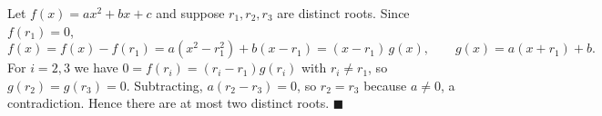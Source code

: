 Let $f(x)=ax^2+bx+c$ and suppose $r_1,r_2,r_3$ are distinct roots. Since $f(r_1)=0$,
\[f(x)=f(x)-f(r_1)=a\left(x^2-r_1^2\right)+b(x-r_1)=(x-r_1)\,g(x),\qquad g(x)=a(x+r_1)+b.\]
For $i=2,3$ we have $0=f(r_i)=(r_i-r_1)g(r_i)$ with $r_i\ne r_1$, so $g(r_2)=g(r_3)=0$. Subtracting, $a(r_2-r_3)=0$, so $r_2=r_3$ because $a\ne0$, a contradiction. Hence there are at most two distinct roots. $\blacksquare$
